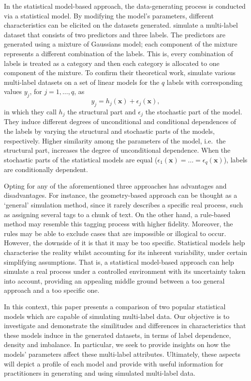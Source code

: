 \documentclass[review]{elsarticle}
\begin{document}
	In the statistical model-based approach, the data-generating process is conducted via a statistical model. By modifying the model's parameters, different characteristics can be elicited on the datasets generated. \citet{EG2} simulate a multi-label dataset that consists of two predictors and three labels. The predictors are generated using a mixture of Gaussians model; each component of the mixture represents a different combination of the labels. This is, every combination of labels is treated as a category and then each category is allocated to one component of the mixture.
	To confirm their theoretical work, \citet{EG1} simulate various multi-label datasets on a set of linear models for the $q$ labels with corresponding values $y_j$, for $j = 1,\ldots,q$, as
	\begin{displaymath}
	y_{j} = h_{j}\left( \mathbf{x} \right) + \epsilon_{j} \left( \mathbf{x} \right),
	\end{displaymath} 
	in which they call $h_{j}$ the structural part and $\epsilon_{j}$ the stochastic part of the model. They induce different degrees of unconditional and conditional dependences of the labels by varying the structural and stochastic parts of the models, respectively. Higher similarity among the parameters of the model, i.e.~the structural part, increases the degree of unconditional dependence. When the stochastic parts of the statistical models are equal ($\epsilon_{1}(\mathbf{x}) = \ldots = \epsilon_{q}(\mathbf{x})$), labels are conditionally dependent. 
	
	Opting for any of the aforementioned three approaches has advantages and disadvantages. For instance, the geometry-based approach can be thought as a `general' simulation method, since it rarely describes a specific real process, such as assigning several tags to a chunk of text. On the other hand, a rule-based method may resemble this tagging process with higher fidelity. Moreover, the rules may be able to exclude cases that are impossible or illogical to occur. However, the downside of it is that it may be too specific.
	Statistical models help characterise the reality whilst accounting for its inherent variability, under certain simplifying assumptions. That is, a statistical model-based approach can help simulate a real process under a controlled environment with its uncertainty taken into account, providing an appealing middle ground between a too general approach and a too specific one. 
	
	In this context, this paper presents a comparison of two popular statistical models which are capable of simulating multi-label data. Our objective is to investigate and demonstrate the similitudes and differences in characteristics that these models induce in the generated datasets, in terms of label dependence, density and imbalance. In particular, we seek to provide insights on how the models' parameters affect these multi-label attributes. Ultimately, these aspects will depict a profile of each model and provide with useful information for practitioners in generating and using simulated multi-label data.
	
\end{document}
